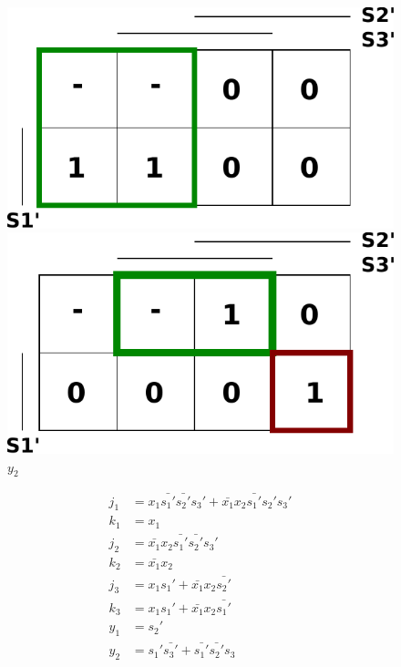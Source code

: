 \documentclass[titlepage]{article}
\begin{document}
\begin{center}
\begin{figure}[ht!]
\begin{minipage}[b]{0.45\linewidth}
\includegraphics[width=\textwidth]{karnaugh_y1.pdf}
	\caption{$y_1$}
\end{minipage}
\begin{minipage}[b]{0.45\linewidth}
\includegraphics[width=\textwidth]{karnaugh_y2.pdf}
	\caption{$y_2$}
\end{minipage}
\end{figure}
\end{center}
\clearpage

\begin{align*}
j_1 &= x_1 \bar{s_1'} \bar{s_2'} s_3' + \bar{x_1} x_2 \bar{s_1'} s_2' s_3' \\
k_1 &= x_1 \\
j_2 &= \bar{x_1} x_2 \bar{s_1'} \bar{s_2'} s_3' \\
k_2 &= \bar{x_1} x_2 \\
j_3 &= x_1 s_1' + \bar{x_1} x_2 \bar{s_2'} \\
k_3 &= x_1 s_1' + \bar{x_1} x_2 \bar{s_1'} \\
y_1 &= s_2' \\
y_2 &= s_1' \bar{s_3'} + \bar{s_1'} \bar{s_2'} s_3 \\
\end{align*}
\end{document}
